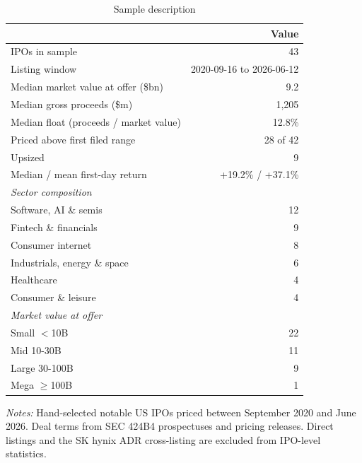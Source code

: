 \begin{table}[!htbp]\centering\small
\caption{Sample description}\label{tab:sample}

\begin{threeparttable}
\begin{tabular}{lr}
\toprule
& Value \\
\midrule
IPOs in sample & 43 \\
Listing window & 2020-09-16 to 2026-06-12 \\
Median market value at offer (\$bn) & 9.2 \\
Median gross proceeds (\$m) & 1,205 \\
Median float (proceeds / market value) & 12.8\% \\
Priced above first filed range & 28 of 42 \\
Upsized & 9 \\
Median / mean first-day return & +19.2\% / +37.1\% \\
\midrule
\multicolumn{2}{l}{\textit{Sector composition}} \\
\quad Software, AI \& semis & 12 \\
\quad Fintech \& financials & 9 \\
\quad Consumer internet & 8 \\
\quad Industrials, energy \& space & 6 \\
\quad Healthcare & 4 \\
\quad Consumer \& leisure & 4 \\
\midrule
\multicolumn{2}{l}{\textit{Market value at offer}} \\
\quad Small $<$10B & 22 \\
\quad Mid 10-30B & 11 \\
\quad Large 30-100B & 9 \\
\quad Mega $\geq$100B & 1 \\
\bottomrule
\end{tabular}
\begin{tablenotes}[flushleft]\footnotesize
\item \textit{Notes:} Hand-selected notable US IPOs priced between September 2020 and June 2026. Deal terms from SEC 424B4 prospectuses and pricing releases. Direct listings and the SK hynix ADR cross-listing are excluded from IPO-level statistics.
\end{tablenotes}
\end{threeparttable}

\end{table}
